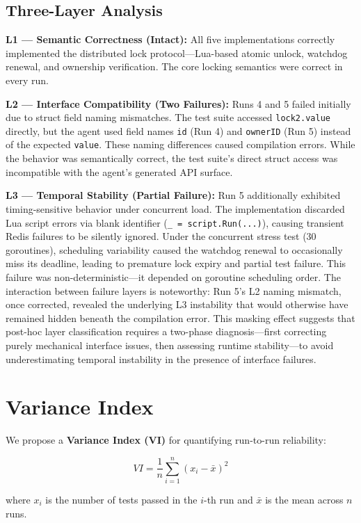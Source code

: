 \documentclass[conference]{IEEEtran}
\begin{document}
\subsection{Three-Layer Analysis}

\textbf{L1 --- Semantic Correctness (Intact):} All five implementations correctly implemented the distributed lock protocol---Lua-based atomic unlock, watchdog renewal, and ownership verification. The core locking semantics were correct in every run.

\textbf{L2 --- Interface Compatibility (Two Failures):} Runs 4 and 5 failed initially due to struct field naming mismatches. The test suite accessed \texttt{lock2.value} directly, but the agent used field names \texttt{id} (Run 4) and \texttt{ownerID} (Run 5) instead of the expected \texttt{value}. These naming differences caused compilation errors. While the behavior was semantically correct, the test suite's direct struct access was incompatible with the agent's generated API surface.

\textbf{L3 --- Temporal Stability (Partial Failure):} Run 5 additionally exhibited timing-sensitive behavior under concurrent load. The implementation discarded Lua script errors via blank identifier (\texttt{\_ = script.Run(...)}), causing transient Redis failures to be silently ignored. Under the concurrent stress test (30 goroutines), scheduling variability caused the watchdog renewal to occasionally miss its deadline, leading to premature lock expiry and partial test failure. This failure was non-deterministic---it depended on goroutine scheduling order.
The interaction between failure layers is noteworthy: Run 5's L2 naming mismatch, once corrected, revealed the underlying L3 instability that would otherwise have remained hidden beneath the compilation error. This masking effect suggests that post-hoc layer classification requires a two-phase diagnosis---first correcting purely mechanical interface issues, then assessing runtime stability---to avoid underestimating temporal instability in the presence of interface failures.

\section{Variance Index}

We propose a \textbf{Variance Index (VI)} for quantifying run-to-run reliability:

\[
VI = \frac{1}{n}\sum_{i=1}^{n}(x_i - \bar{x})^2
\]

where $x_i$ is the number of tests passed in the $i$-th run and $\bar{x}$ is the mean across $n$ runs.
\end{document}
